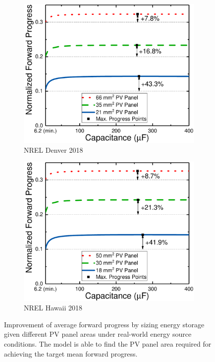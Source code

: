 \begin{figure}[!t]
\begin{subfigure}{0.49\columnwidth}
        \label{fig:harvstor2}
    \end{subfigure}
    \hfil
    \begin{subfigure}{0.49\columnwidth}
        \centering
        \includegraphics[width=\columnwidth]{ch4_sizingapproach/figures/HarvStorTgFig3}
        \caption{NREL Denver 2018}
        \label{fig:harvstor3}
    \end{subfigure}
    \begin{subfigure}{0.49\columnwidth}
        \centering
        \includegraphics[width=\columnwidth]{ch4_sizingapproach/figures/HarvStorTgFig4}
        \caption{NREL Hawaii 2018}
        \label{fig:harvstor4}
    \end{subfigure}
    \caption{Improvement of average forward progress by sizing energy storage given different PV panel areas under real-world energy source conditions. The model is able to find the PV panel area required for achieving the target mean forward progress. } 
    \label{fig:harvstor}
\end{figure}

